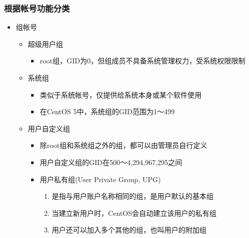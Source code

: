 \documentclass[xcolor=svgnames,presentation]{beamer}
\begin{document}
\begin{frame}
\frametitle{根据帐号功能分类}
\label{sec-1-1-5}
\begin{itemize}

\item 组帐号
\label{sec-1-1-5-1}%
\begin{itemize}

\item 超级用户组
\label{sec-1-1-5-1-1}%
\begin{itemize}

\item root组，GID为0，但组成员不具备系统管理权力，受系统权限限制
\label{sec-1-1-5-1-1-1}%
\end{itemize} %

\item 系统组
\label{sec-1-1-5-1-2}%
\begin{itemize}

\item 类似于系统帐号，仅提供给系统本身或某个软件使用
\label{sec-1-1-5-1-2-1}%

\item 在CentOS 5中，系统组的GID范围为1～499
\label{sec-1-1-5-1-2-2}%
\end{itemize} %

\item 用户自定义组
\label{sec-1-1-5-1-3}%
\begin{itemize}

\item 除root组和系统组之外的组，都可以由管理员自行定义
\label{sec-1-1-5-1-3-1}%

\item 用户自定义组的GID在500～4,294,967,295之间
\label{sec-1-1-5-1-3-2}%

\item 用户私有组(User Private Group, UPG)
\label{sec-1-1-5-1-3-3}%
\begin{enumerate}
\item 是指与用户账户名称相同的组，是用户默认的基本组
\item 当建立新用户时，CentOS会自动建立该用户的私有组
\item 用户还可以加入多个其他的组，也叫用户的附加组
\end{enumerate}
\end{itemize} %
\end{itemize} %
\end{itemize} %
\end{frame}
\end{document}
